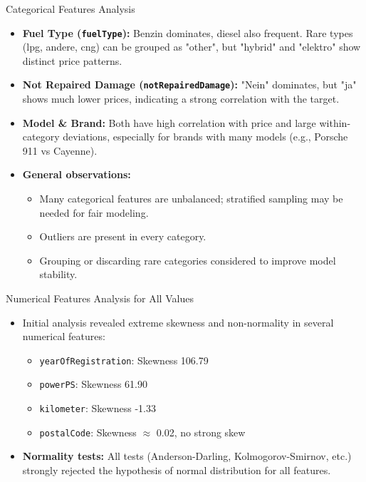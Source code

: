 \documentclass{beamer}
\begin{document}
\begin{frame}{Categorical Features Analysis}
    \begin{itemize}
        \item \textbf{Fuel Type (\texttt{fuelType}):} Benzin dominates, diesel also frequent. Rare types (lpg, andere, cng) can be grouped as "other", but "hybrid" and "elektro" show distinct price patterns.
        \item \textbf{Not Repaired Damage (\texttt{notRepairedDamage}):} "Nein" dominates, but "ja" shows much lower prices, indicating a strong correlation with the target.
        \item \textbf{Model \& Brand:} Both have high correlation with price and large within-category deviations, especially for brands with many models (e.g., Porsche 911 vs Cayenne).
        \item \textbf{General observations:}
            \begin{itemize}
                \item Many categorical features are unbalanced; stratified sampling may be needed for fair modeling.
                \item Outliers are present in every category.
                \item Grouping or discarding rare categories considered to improve model stability.
            \end{itemize}
    \end{itemize}
\end{frame}


\begin{frame}{Numerical Features Analysis for All Values}
    \begin{itemize}
        \item Initial analysis revealed extreme skewness and non-normality in several numerical features:
        \begin{itemize}
            \item \texttt{yearOfRegistration}: Skewness 106.79
            \item \texttt{powerPS}: Skewness 61.90 
            \item \texttt{kilometer}: Skewness -1.33
            \item \texttt{postalCode}: Skewness $\approx$ 0.02, no strong skew
        \end{itemize}
        \item \textbf{Normality tests:} All tests (Anderson-Darling, Kolmogorov-Smirnov, etc.) strongly rejected the hypothesis of normal distribution for all features.
    \end{itemize}
\end{frame}
\end{document}
